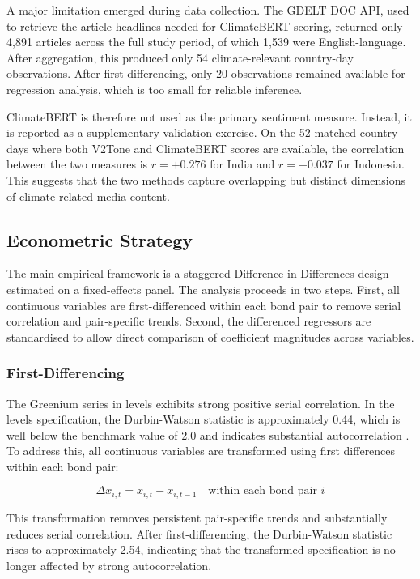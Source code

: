 \documentclass[12pt,a4paper]{article}
\begin{document}
A major limitation emerged during data collection. The GDELT DOC API, used to retrieve the article headlines needed for ClimateBERT scoring, returned only 4,891 articles across the full study period, of which 1,539 were English-language. After aggregation, this produced only 54 climate-relevant country-day observations. After first-differencing, only 20 observations remained available for regression analysis, which is too small for reliable inference.

ClimateBERT is therefore not used as the primary sentiment measure. Instead, it is reported as a supplementary validation exercise. On the 52 matched country-days where both V2Tone and ClimateBERT scores are available, the correlation between the two measures is $r = +0.276$ for India and $r = -0.037$ for Indonesia. This suggests that the two methods capture overlapping but distinct dimensions of climate-related media content.

\subsection{Econometric Strategy}

The main empirical framework is a staggered Difference-in-Differences design estimated on a fixed-effects panel. The analysis proceeds in two steps. First, all continuous variables are first-differenced within each bond pair to remove serial correlation and pair-specific trends. Second, the differenced regressors are standardised to allow direct comparison of coefficient magnitudes across variables.

\subsubsection{First-Differencing}

The Greenium series in levels exhibits strong positive serial correlation. In the levels specification, the Durbin-Watson statistic is approximately 0.44, which is well below the benchmark value of 2.0 and indicates substantial autocorrelation \citep{Durbin1950}. To address this, all continuous variables are transformed using first differences within each bond pair:

\begin{equation}
\Delta x_{i,t} = x_{i,t} - x_{i,t-1}
\quad \text{within each bond pair } i
\label{eq:fd}
\end{equation}

This transformation removes persistent pair-specific trends and substantially reduces serial correlation. After first-differencing, the Durbin-Watson statistic rises to approximately 2.54, indicating that the transformed specification is no longer affected by strong autocorrelation.
\end{document}
